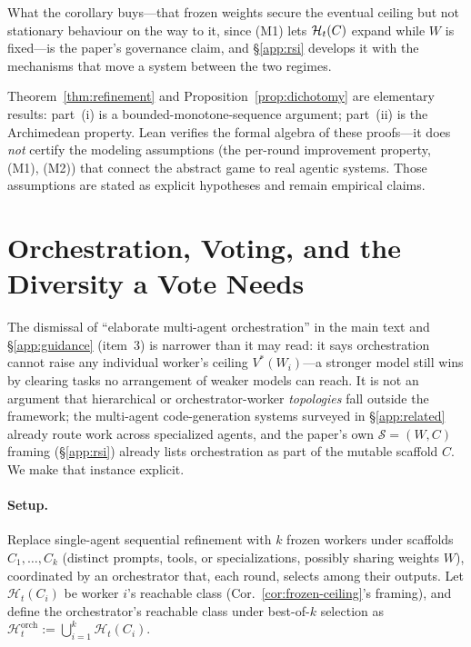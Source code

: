 What the corollary buys---that frozen weights secure the eventual ceiling but not stationary behaviour on the way to it, since (M1) lets $\mathcal{H}_t(C)$ expand while $W$ is fixed---is the paper's governance claim, and \S\ref{app:rsi} develops it with the mechanisms that move a system between the two regimes.

\begin{remark}
\label{rem:lean-honesty}
Theorem~\ref{thm:refinement} and Proposition~\ref{prop:dichotomy} are elementary results: part~(i) is a bounded-monotone-sequence argument; part~(ii) is the Archimedean property. Lean verifies the formal algebra of these proofs---it does \emph{not} certify the modeling assumptions (the per-round improvement property, (M1), (M2)) that connect the abstract game to real agentic systems. Those assumptions are stated as explicit hypotheses and remain empirical claims.
\end{remark}

\section{Orchestration, Voting, and the Diversity a Vote Needs}
\label{app:orchestration}

The dismissal of ``elaborate multi-agent orchestration'' in the main text and \S\ref{app:guidance} (item~3) is narrower than it may read: it says orchestration cannot raise any individual worker's ceiling $V^*(W_i)$---a stronger model still wins by clearing tasks no arrangement of weaker models can reach. It is not an argument that hierarchical or orchestrator-worker \emph{topologies} fall outside the framework; the multi-agent code-generation systems surveyed in \S\ref{app:related} already route work across specialized agents, and the paper's own $\mathcal{S}=(W,C)$ framing (\S\ref{app:rsi}) already lists orchestration as part of the mutable scaffold $C$. We make that instance explicit.

\paragraph{Setup.} Replace single-agent sequential refinement with $k$ frozen workers under scaffolds $C_1,\dots,C_k$ (distinct prompts, tools, or specializations, possibly sharing weights $W$), coordinated by an orchestrator that, each round, selects among their outputs. Let $\mathcal{H}_t(C_i)$ be worker $i$'s reachable class (Cor.~\ref{cor:frozen-ceiling}'s framing), and define the orchestrator's reachable class under best-of-$k$ selection as $\mathcal{H}_t^{\mathrm{orch}} := \bigcup_{i=1}^k \mathcal{H}_t(C_i)$.


